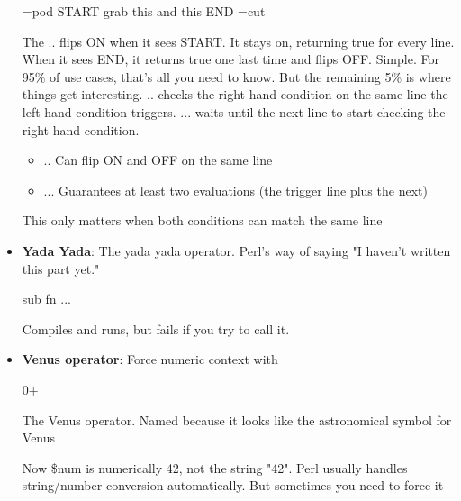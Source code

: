 \documentclass{report}
\begin{document}
\begin{itemize}
\begin{perlcode}
                =pod
                    START
                    grab this
                    and this
                    END
                =cut
            \end{perlcode}
            \bigbreak \noindent 
            The .. flips ON when it sees START. It stays on, returning true for every line. When it sees END, it returns true one last time and flips OFF. Simple. For 95\% of use cases, that's all you need to know. But the remaining 5\% is where things get interesting.
            \bigbreak \noindent 
            .. checks the right-hand condition on the same line the left-hand condition triggers. ... waits until the next line to start checking the right-hand condition.
            \begin{itemize}
                \item ..   Can flip ON and OFF on the same line
                \item ...  Guarantees at least two evaluations (the trigger line plus the next)
            \end{itemize}
            This only matters when both conditions can match the same line
        \item \textbf{Yada Yada}: The yada yada operator. Perl's way of saying "I haven't written this part yet."
            \bigbreak \noindent 
            \begin{perlcode}
                sub fn {
                    ...
                }
            \end{perlcode}
            \bigbreak \noindent 
            Compiles and runs, but fails if you try to call it.
        \item \textbf{Venus operator}: Force numeric context with
            \bigbreak \noindent 
            \begin{perlcode}
            0+
            \end{perlcode}
            \bigbreak \noindent 
            The Venus operator. Named because it looks like the astronomical symbol for Venus
            \bigbreak \noindent 
            \bigbreak \noindent 
            Now \$num is numerically 42, not the string "42". Perl usually handles string/number conversion automatically. But sometimes you need to force it



\end{itemize}
\end{document}
